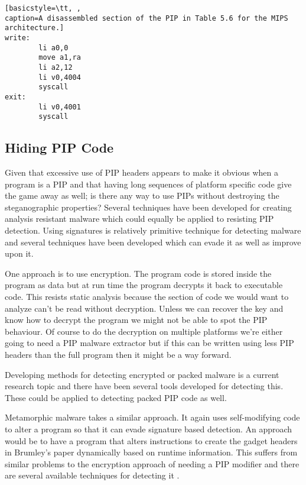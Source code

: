 \documentclass[10pt,]{book}
\begin{document}
\begin{lstlisting}[basicstyle=\tt, ,
caption=A disassembled section of the PIP in Table 5.6 for the MIPS architecture.]
write:
        li a0,0
        move a1,ra
        li a2,12
        li v0,4004
        syscall
exit:
        li v0,4001
        syscall
\end{lstlisting}
\subsection{Hiding PIP Code}

Given that excessive use of PIP headers appears to make it obvious when
a program is a PIP and that having long sequences of platform specific
code give the game away as well; is there any way to use PIPs without
destroying the steganographic properties? Several techniques have been
developed for creating analysis resistant
malware\autocite{Bethencourt:2008ug} which could equally be applied to
resisting PIP detection. Using signatures is relatively primitive
technique for detecting malware\autocite{Zhang:2007jy} and several
techniques have been developed which can evade it as well as improve
upon it.

One approach is to use encryption. The program code is stored inside the
program as data but at run time the program decrypts it back to
executable code\autocite{Royal:2006ug}. This resists static analysis
because the section of code we would want to analyze can't be read
without decryption. Unless we can recover the key and know how to
decrypt the program we might not be able to spot the PIP behaviour. Of
course to do the decryption on multiple platforms we're either going to
need a PIP malware extractor but if this can be written using less PIP
headers than the full program then it might be a way forward.

Developing methods for detecting encrypted or packed malware is a
current research topic and there have been several tools developed for
detecting this\autocite{Chouchane:2006cf}\autocite{Zhang:2007jy}. These
could be applied to detecting packed PIP code as well.

Metamorphic malware\autocite{Sikorski:2011ua} takes a similar approach.
It again uses self-modifying code to alter a program so that it can
evade signature based detection. An approach would be to have a program
that alters instructions to create the gadget headers in Brumley's
paper\autocite{Cha:2010uh} dynamically based on runtime information.
This suffers from similar problems to the encryption approach of needing
a PIP modifier and there are several available techniques for detecting
it \autocite{Han:2011iu}\autocite{Ali:2011do}.
\end{document}
